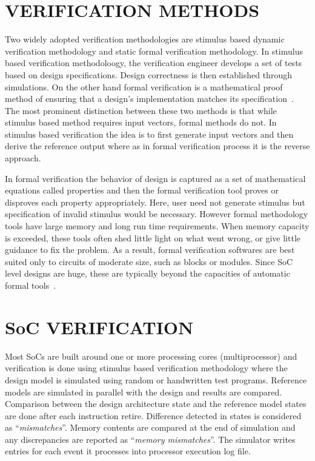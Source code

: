 \section{VERIFICATION METHODS}
Two widely adopted verification methodologies are stimulus based dynamic verification methodology and static formal verification methodology. In stimulus based verification methodoloogy, the verification engineer develops a set of tests based on design specifications. Design correctness is then established through simulations. On the other hand formal verification is a mathematical proof method of ensuring that a design's implementation matches its specification~\citep*{ieee:segev:2004}. The most prominent distinction between these two methods is that while stimulus based method requires input vectors, formal methods do not. In stimulus based verification the idea is to first generate input vectors and then derive the reference output where as in formal verification process it is the reverse approach.

In formal verification the behavior of design is captured as a set of mathematical equations called properties and then the formal verification tool proves or disproves each property appropriately. Here, user need not generate stimulus but specification of invalid stimulus would be necessary. However formal methodology tools have large memory and long run time requirements. When memory capacity is exceeded, these tools often shed little light on what went wrong, or give little guidance to fix the problem. As a result, formal verification softwares are best suited only to circuits of moderate size, such as blocks or modules. Since SoC level designs are huge, these are typically beyond the capacities of automatic formal tools~\citep*{ieee:formal:2004}. 

\section{SoC VERIFICATION}
Most SoCs are built around one or more processing cores (multiprocessor) and verification is done using stimulus based verification methodology where the design model is simulated using random or handwritten test programs. Reference models are simulated in parallel with the design and results are compared. Comparison between the design architecture state and the reference model states are done after each instruction retire. Difference detected in states is considered as ``{\it mismatches}''. Memory contents are compared at the end of simulation and any discrepancies are reported as ``{\it memory mismatches}''. The simulator writes entries for each event it processes into processor execution log file.


